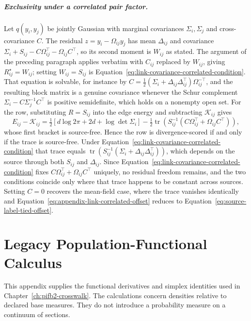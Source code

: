 \paragraph{Exclusivity under a correlated pair factor.} Let \(q(y_i,y_j)\) be jointly Gaussian with marginal covariances \(\Sigma_i,\Sigma_j\) and cross-covariance \(C\). The residual \(z=y_i-\Omega_{ij}y_j\) has mean \(\Delta_{ij}\) and covariance \(\Sigma_i+S_{ij}-C\Omega_{ij}^\top-\Omega_{ij}C^\top\), so its second moment is \(W_{ij}\) as stated. The argument of the preceding paragraph applies verbatim with \(C_{ij}\) replaced by \(W_{ij}\), giving \(R^\star_{ij}=W_{ij}\); setting \(W_{ij}=S_{ij}\) is Equation~\eqref{eq:link-covariance-correlated-condition}. That equation is solvable, for instance by \(C=\tfrac12(\Sigma_i+\Delta_{ij}\Delta_{ij}^\top)\Omega_{ij}^{-\top}\), and the resulting block matrix is a genuine covariance whenever the Schur complement \(\Sigma_i-C\Sigma_j^{-1}C^\top\) is positive semidefinite, which holds on a nonempty open set. For the row, substituting \(R=S_{ij}\) into the edge energy and subtracting \(\mathcal K_{ij}\) gives
\begin{equation}
E_{ij}-\mathcal K_{ij}
=\tfrac12\left[d\log2\pi+2d+\log\det\Sigma_i\right]
-\tfrac12\operatorname{tr}\left(S_{ij}^{-1}\left(C\Omega_{ij}^\top+\Omega_{ij}C^\top\right)\right),
\label{eq:appendix-link-correlated-offset}
\end{equation}
whose first bracket is source-free. Hence the row is divergence-scored if and only if the trace is source-free. Under Equation~\eqref{eq:link-covariance-correlated-condition} that trace equals \(\operatorname{tr}(S_{ij}^{-1}(\Sigma_i+\Delta_{ij}\Delta_{ij}^\top))\), which depends on the source through both \(S_{ij}\) and \(\Delta_{ij}\). Since Equation~\eqref{eq:link-covariance-correlated-condition} fixes \(C\Omega_{ij}^\top+\Omega_{ij}C^\top\) uniquely, no residual freedom remains, and the two conditions coincide only where that trace happens to be constant across sources. Setting \(C=0\) recovers the mean-field case, where the trace vanishes identically and Equation~\eqref{eq:appendix-link-correlated-offset} reduces to Equation~\eqref{eq:source-label-tied-offset}.

\chapter{Legacy Population-Functional Calculus}

This appendix supplies the functional derivatives and simplex identities used in Chapter~\ref{ch:pifb2-crosswalk}. The calculations concern densities relative to declared base measures. They do not introduce a probability measure on a continuum of sections.

